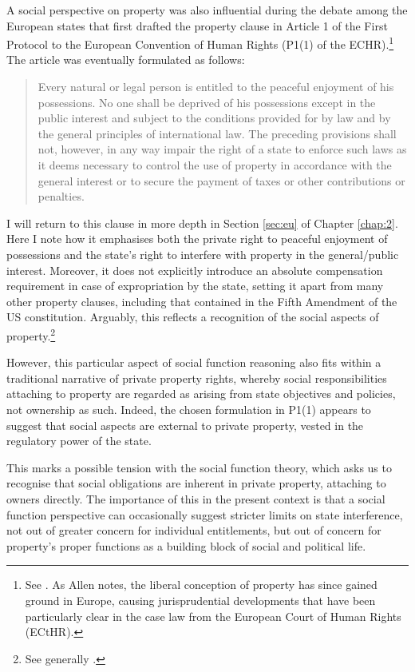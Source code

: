 A social perspective on property was also influential during the debate among the European states that first drafted the property clause in Article 1 of the First Protocol to the European Convention of Human Rights (P1(1) of the ECHR).\footnote{See \cite[1063-1065]{allen10}. As Allen notes, the liberal conception of property has since gained ground in Europe, causing jurisprudential developments that have been particularly clear in the case law from the European Court of Human Rights (ECtHR).} The article was eventually formulated as follows:

\begin{quote} Every natural or legal person is entitled to the peaceful enjoyment of his possessions. No one shall be deprived of his possessions except in the public interest and subject to the conditions provided for by law and by the general principles of international law.
The preceding provisions shall not, however, in any way impair the right of a state to enforce such laws as it deems necessary to control the use of property in accordance with the general interest or to secure the payment of taxes or other contributions or penalties.
\end{quote}

I will return to this clause in more depth in Section \ref{sec:eu} of Chapter \ref{chap:2}. Here I note how it emphasises both the private right to peaceful enjoyment of possessions and the state's right to interfere with property in the general/public interest. Moreover, it does not explicitly introduce an absolute compensation requirement in case of expropriation by the state, setting it apart from many other property clauses, including that contained in the Fifth Amendment of the US constitution. Arguably, this reflects a recognition of the social aspects of property.\footnote{See generally \cite{allen10}.} 

However, this particular aspect of social function reasoning also fits within a traditional narrative of private property rights, whereby social responsibilities attaching to property are regarded as arising from state objectives and policies, not ownership as such. Indeed, the chosen formulation in P1(1) appears to suggest that social aspects are external to private property, vested in the regulatory power of the state. 

This marks a possible tension with the social function theory, which asks us to recognise that social obligations are inherent in private property, attaching to owners directly. The importance of this in the present context is that a social function perspective can occasionally suggest stricter limits on state interference, not out of greater concern for individual entitlements, but out of concern for property's proper functions as a building block of social and political life.


